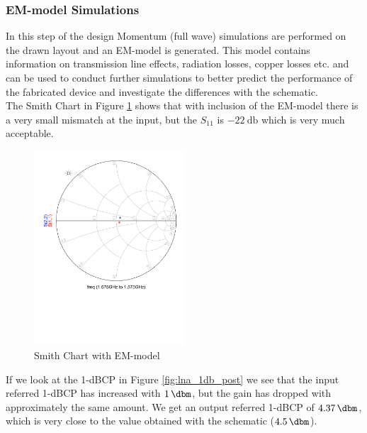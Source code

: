 \documentclass[a4paper]{article}        %
\begin{document}
		\subsubsection{EM-model Simulations}
			In this step of the design Momentum (full wave) simulations are performed on the drawn layout and an EM-model is generated. This model contains information on transmission line effects, radiation losses, copper losses etc. and can be used to conduct further simulations to better predict the performance of the fabricated device and investigate the differences with the schematic. \\

			The Smith Chart in Figure \ref{fig:lna_smith_post} shows that with inclusion of the EM-model there is a very small mismatch at the input, but the $S_{11}$ is $\SI{-22}{\decibel}$ which is very much acceptable.

			\begin{figure}[H]
			\centering
				\includegraphics[width=0.5\textwidth]{fig/LNA/matching_post.pdf}
			\caption{Smith Chart with EM-model}
			\label{fig:lna_smith_post}
			\end{figure}

			If we look at the 1-dBCP in Figure \ref{fig:lna_1db_post} we see that the input referred 1-dBCP has increased with $\SI{1}{\dbm}$, but the gain has dropped with approximately the same amount. We get an output referred 1-dBCP of $\SI{4.37}{\dbm}$, which is very close to the value obtained with the schematic ($\SI{4.5}{\dbm}$). 
\end{document}
